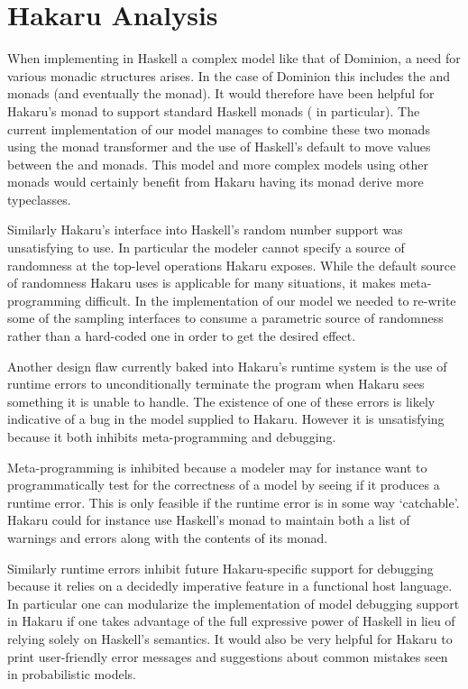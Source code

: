 \section{Hakaru Analysis} \label{sec:hakaru-analysis}

When implementing in Haskell a complex model like that of Dominion, a
need for various monadic structures arises. In the case of Dominion
this includes the  and  monads (and eventually
the  monad). It would therefore have been helpful for Hakaru's
 monad to support standard Haskell monads ( in
particular). The current implementation of our model manages to combine
these two monads using the  monad transformer and the use
of Haskell's default  to move values between the  and
 monads. This model and more complex models using other
monads would certainly benefit from Hakaru having its 
monad derive more typeclasses.

Similarly Hakaru's interface into Haskell's random number support was
unsatisfying to use. In particular the modeler cannot specify a source
of randomness at the top-level operations Hakaru exposes. While the
default source of randomness Hakaru uses is applicable for many situations,
it makes meta-programming difficult. In the implementation of our model
we needed to re-write some of the sampling interfaces to consume a parametric
source of randomness rather than a hard-coded one in order to get the
desired effect.

Another design flaw currently baked into Hakaru's runtime system is the
use of runtime errors to unconditionally terminate the program when
Hakaru sees something it is unable to handle. The existence of
one of these errors is likely indicative of a bug in the model supplied
to Hakaru. However it is unsatisfying because it both inhibits
meta-programming and debugging.

Meta-programming is inhibited because a modeler may for instance want to
programmatically test for the correctness of a model by seeing if it
produces a runtime error. This is only feasible if the runtime error
is in some way `catchable'. Hakaru could for instance use Haskell's
 monad to maintain both a list of warnings and errors
along with the contents of its  monad.

Similarly runtime errors inhibit future Hakaru-specific support for
debugging because it relies on a decidedly imperative feature in a
functional host language. In particular one can modularize the implementation
of model debugging support in Hakaru if one takes advantage of the full
expressive power of Haskell in lieu of relying solely on Haskell's 
semantics. It would also be very helpful for Hakaru to print user-friendly
error messages and suggestions about common mistakes seen in probabilistic
models.

